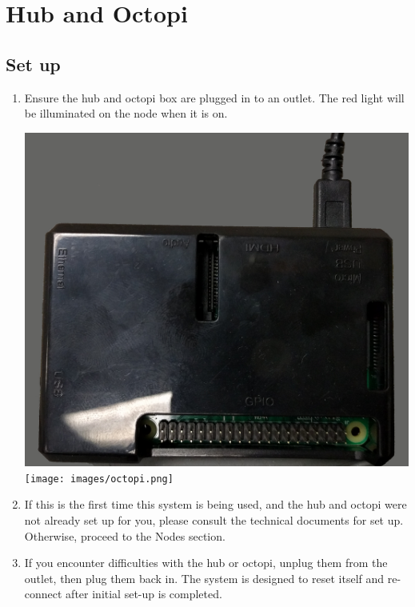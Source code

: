   \section{Hub and Octopi}
  \subsection{Set up}
    \begin{enumerate}
      \item Ensure the hub and octopi box are plugged in to an outlet.
      The red light will be illuminated on the node when it is on.\\ 
      \begin{center}
      \includegraphics[scale=.1]{images/Hub.png}
      \texttt{[image: images/octopi.png]}
    \end{center}

      \item If this is the first time this system is being used, and the hub and octopi were not already set up for you, please consult
      the technical documents for set up.  Otherwise, proceed to the Nodes section.

      \item If you encounter difficulties with the hub or octopi, unplug them from the outlet, then
       plug them back in.  The system is designed to reset itself and re-connect
       after initial set-up is completed.
    \end{enumerate}
